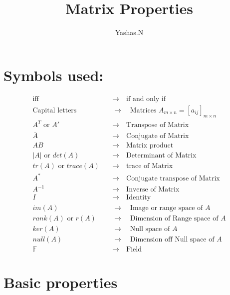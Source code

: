 \documentclass[11pt]{extarticle}
\author{Yashas.N}
\title{Matrix Properties}
\date{}
\newcommand{\w}[1]{\text{#1}}
\begin{document}
	\maketitle
	\boldmath
	
\begin{multicols}{2}
\section*{Symbols used:}
{\scriptsize 
	\begin{align*}
	\text{iff} \quad&\rightarrow\quad\text{if and only if}\\
	\text{Capital letters}\quad&\rightarrow\quad\text{Matrices }A_{m\times n}=[a_{ij}]_{m \times n}\\
	A^T \text{ or } A'\quad&\rightarrow\quad\text{Transpose of Matrix}\\
	\bar{A}\quad&\rightarrow\quad\text{Conjugate of Matrix}\\
	AB\quad&\rightarrow\quad\text{Matrix product}\\
	|A|\text{ or } det(A) \quad&\rightarrow\quad\text{Determinant of Matrix}\\
	tr(A)\text{ or }trace(A) \quad&\rightarrow\quad\text{trace of Matrix}\\
	A^*\quad&\rightarrow\quad\text{Conjugate transpose of Matrix}\\
	A^{-1} \quad&\rightarrow\quad\text{Inverse of Matrix}\\
	I \quad&\rightarrow\quad\text{Identity}\\
	im(A) \quad&\rightarrow\quad \text{Image or range space of }A\\
	rank(A)\w{ or } r(A)\quad&\rightarrow\quad \text{Dimension of Range space of }A\\
	ker(A) \quad&\rightarrow\quad \text{Null space of }A\\
	null(A) \quad&\rightarrow\quad \text{Dimension off Null space of }A\\ 
	\mathbb{F}  \quad&\rightarrow\quad \text{Field}
\end{align*}}


\section{Basic properties}


\end{multicols}
\end{document}
